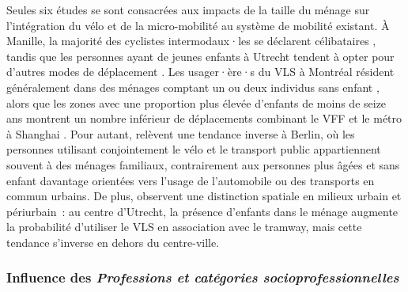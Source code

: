 \begin{refsegment}
Seules six études se sont consacrées aux impacts de la taille du ménage sur l'intégration du vélo et de la micro-mobilité au système de mobilité existant. À Manille, la majorité des cyclistes intermodaux·les se déclarent célibataires \textcolor{blue}{\autocite[246]{fillone_i_2018}}, tandis que les personnes ayant de jeunes enfants à Utrecht tendent à opter pour d'autres modes de déplacement \textcolor{blue}{\autocite[272]{krygsman_multimodal_2004}}. Les usager·ère·s du \acrshort{VLS} à Montréal résident généralement dans des ménages comptant un ou deux individus sans enfant \textcolor{blue}{\autocite[113]{bachand-marleau_much-anticipated_2011}}, alors que les zones avec une proportion plus élevée d'enfants de moins de seize ans montrent un nombre inférieur de déplacements combinant le \acrshort{VFF} et le métro à Shanghai \textcolor{blue}{\autocite[11]{hu_examining_2022}}. Pour autant, \textcolor{blue}{\textcite[74]{oostendorp_combining_2018}} relèvent une tendance inverse à Berlin, où les personnes utilisant conjointement le vélo et le transport public appartiennent souvent à des ménages familiaux, contrairement aux personnes plus âgées et sans enfant davantage orientées vers l'usage de l'automobile ou des transports en commun urbains. De plus, \textcolor{blue}{\textcite[299]{kuijk_preferences_2022}} observent une distinction spatiale en milieux urbain et périurbain~: au centre d'Utrecht, la présence d'enfants dans le ménage augmente la probabilité d'utiliser le \acrshort{VLS} en association avec le tramway, mais cette tendance s'inverse en dehors du centre-ville.%

\subsubsection*{Influence des \textsl{Professions et catégories socioprofessionnelles}
    \label{chap2:pcs}
    }
    

\end{refsegment}
